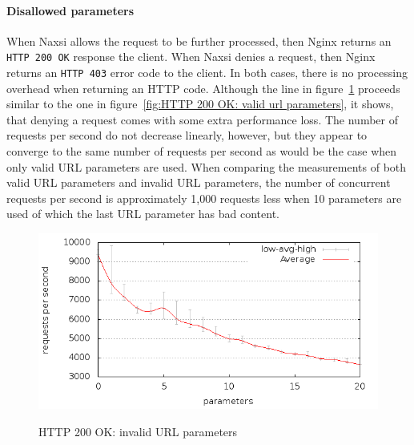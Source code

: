 \documentclass[Experiments]{subfiles}
\begin{document}
\paragraph{Disallowed parameters}
When Naxsi allows the request to be further processed, then Nginx returns an \verb+HTTP 200 OK+ response the client. When Naxsi denies a request, then Nginx returns an \verb+HTTP 403+ error code to the client. In both cases, there is no processing overhead when returning an HTTP code. Although the line in figure~\ref{fig:HTTP 200 OK: invalid url parameters} proceeds similar to the one in figure~\ref{fig:HTTP 200 OK: valid url parameters}, it shows, that denying a request comes with some extra performance loss. The number of requests per second do not decrease linearly, however, but they appear to converge to the same number of requests per second as would be the case when only valid \ac{URL} parameters are used. When comparing the measurements of both valid \ac{URL} parameters and invalid \ac{URL} parameters, the number of concurrent requests per second is approximately 1,000 requests less when 10 parameters are used of which the last \ac{URL} parameter has bad content.

\begin{figure}[H]
\caption{HTTP 200 OK: invalid URL parameters}
\centering
\includegraphics[scale=0.55] {images/results/200_with_naxsi_incremented_disallowed_parameters/output.png}
\label{fig:HTTP 200 OK: invalid url parameters}
\end{figure}
\end{document}
